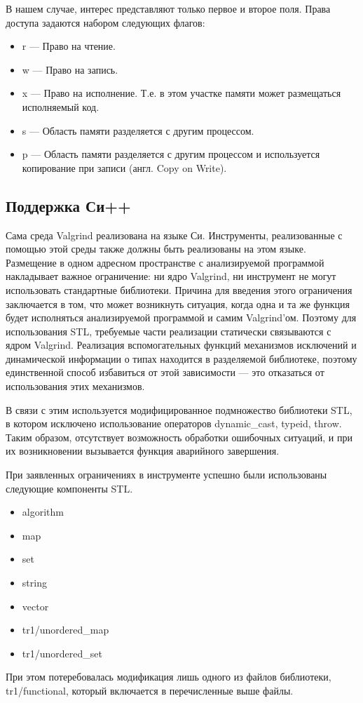 \documentclass[a4paper,12pt,russian]{article}
\newcommand{\code}[1]{\textsf{#1}}
\begin{document}
В нашем случае, интерес представляют только первое и второе поля.
Права доступа задаются набором следующих флагов:
\begin{itemize}
    \item \code{r} --- Право на чтение.
    \item \code{w} --- Право на запись.
    \item \code{x} --- Право на исполнение. Т.е. в этом участке памяти может размещаться исполняемый код.
    \item \code{s} --- Область памяти разделяется с другим процессом.
    \item \code{p} --- Область памяти разделяется с другим процессом и используется копирование при записи (англ. Copy on Write).
\end{itemize}

\subsection{Поддержка Си++}
Сама среда \code{Valgrind} реализована на языке Си. Инструменты, реализованные с помощью этой среды также должны быть реализованы на этом языке.
Размещение в одном адресном пространстве с анализируемой программой накладывает важное ограничение: ни ядро \code{Valgrind}, ни инструмент не могут использовать стандартные библиотеки.
Причина для введения этого ограничения заключается в том, что может возникнуть ситуация, когда одна и та же функция будет исполняться анализируемой программой и самим \code{Valgrind}'ом.
Поэтому для использования \code{STL}, требуемые части реализации статически связываются с ядром \code{Valgrind}.
Реализация вспомогательных функций механизмов исключений и динамической информации о типах находится в разделяемой библиотеке, поэтому единственной способ избавиться от этой зависимости --- это отказаться от использования этих механизмов.

В связи с этим используется модифицированное подмножество библиотеки \code{STL}, в котором исключено использование операторов \code{dynamic\_cast}, \code{typeid}, \code{throw}. Таким образом, отсутствует возможность обработки ошибочных ситуаций, и при их возникновении вызывается функция аварийного завершения.

При заявленных ограничениях в инструменте успешно были использованы следующие компоненты \code{STL}.
\begin{itemize}
    \item \code{algorithm}
    \item \code{map}
    \item \code{set}
    \item \code{string}
    \item \code{vector}
    \item \code{tr1/unordered\_map}
    \item \code{tr1/unordered\_set}
\end{itemize}
При этом потеребовалась модификация лишь одного из файлов библиотеки, \code{tr1/functional}, который включается в перечисленные выше файлы.
\end{document}
